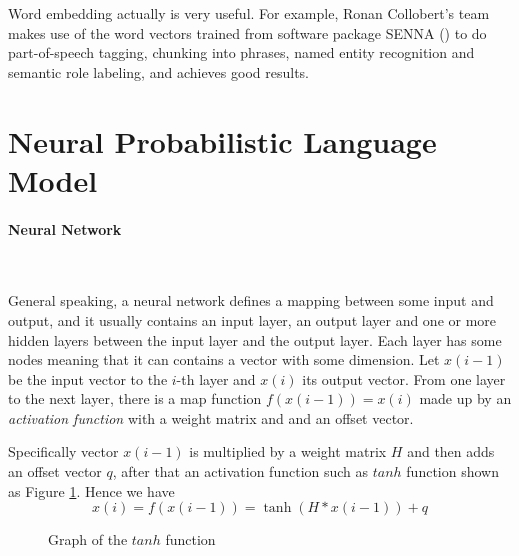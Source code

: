 Word embedding actually is very useful. For example, Ronan Collobert's team makes use of the word vectors trained from software package SENNA (\citep{CollobertWestonEtAl2011}) to do part-of-speech tagging, chunking into phrases, named entity recognition and semantic role labeling, and achieves good results. 


\section{Neural Probabilistic Language Model}


\paragraph{Neural Network}\ 

General speaking, a neural network defines a mapping between some input and output, and it usually contains an input layer, an output layer and one or more hidden layers between the input layer and the output layer. Each layer has some nodes meaning that it can contains a vector with some dimension. Let $x(i-1)$ be the input vector to the $i$-th layer and $x(i)$ its output vector.
From one layer to the next layer, there is a map function $f(x(i-1))=x(i)$ made up by an \emph{activation function} with a weight matrix and and an offset vector. 

Specifically  vector $x(i-1)$ is  multiplied by a weight matrix $H$ and then adds an offset vector $q$, after that an activation function such as $tanh$ function shown as Figure \ref{fig:tanh}. Hence we have 
\begin{equation}
x(i) = f(x(i-1)) = \tanh(H * x(i-1)) + q
\end{equation}

\begin{figure}[tb]
  \centering
	\caption{Graph of the $tanh$ function}
	\label{fig:tanh}
\end{figure}


